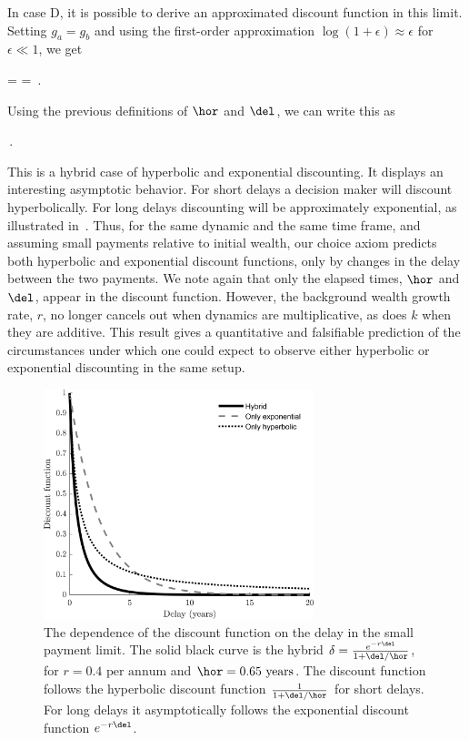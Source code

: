 In case D, it is possible to derive an approximated discount function in this limit. Setting $g_a=g_b$ and using the first-order approximation $\log(1+\epsilon)\approx\epsilon$ for $\epsilon\ll1$, we get

\be
\delta =  \approx {} = \,.
\ee

Using the previous definitions of $\hor$ and $\del$, we can write this as

\be
\delta \approx {}\,.
\ee

This is a hybrid case of hyperbolic and exponential discounting. It displays an interesting asymptotic behavior. For short delays a decision maker will discount hyperbolically. For long delays discounting will be approximately exponential, as illustrated in~. Thus, for the same dynamic and the same time frame, and assuming small payments relative to initial wealth, our choice axiom predicts both hyperbolic and exponential discount functions, only by changes in the delay between the two payments. We note again that only the elapsed times, $\hor$ and $\del$, appear in the discount function. However, the background wealth growth rate, $r$, no longer cancels out when dynamics are multiplicative, as does $k$ when they are additive. This result gives a quantitative and falsifiable prediction of the circumstances under which one could expect to observe either hyperbolic or exponential discounting in the same setup.

\begin{figure}[!htb]
\centering
\includegraphics[width=0.7\textwidth]{./figures/caseD_delta_asymptotic.jpg}
\caption{The dependence of the discount function on the delay in the small payment limit. The solid black curve is the hybrid $\delta = \frac{e^{-r\del}}{1+\del/\hor}$, for $r=0.4\text{ per annum}$ and $\hor=0.65\text{ years}$. The discount function follows the hyperbolic discount function $\frac{1}{1+\del/\hor}$ for short delays. For long delays it asymptotically follows the exponential discount function $e^{-r\del}$.}
\end{figure}


